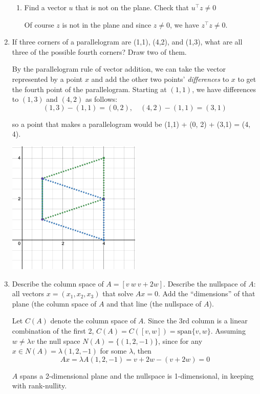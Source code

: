 \documentclass{scrartcl}
\begin{document}
\begin{enumerate}
\begin{enumerate}
\item Find a vector $u$ that is not on the plane. Check that $u^\top z \neq 0$


	Of course $z$ is not in the plane and since $z \neq 0$, we have $z^\top z \neq 0$.
\end{enumerate}

\item If three corners of a parallelogram are (1,1), (4,2), and (1,3), what are all three of the possible fourth corners? Draw two of them.

By the parallelogram rule of vector addition, we can take the vector represented by a point $x$ and add the other two points' \emph{differences} to $x$ to get the fourth point of the parallelogram. Starting at $(1,1)$, we have differences to $(1, 3)$ and $(4,2)$ as follows:
$$(1,3) - (1,1) = (0, 2), \quad (4,2) - (1,1) = (3,1)$$

so a point that makes a parallelogram would be (1,1) + (0, 2) + (3,1) = (4, 4).
\begin{center}
	\includegraphics[width=0.5\textwidth]{imgs/1.1.6.png}
\end{center}

\item Describe the column space of $A = [v \ w \ v+2w]$. Describe the nullspace of $A$: all vectors $x = (x_1, x_2, x_3)$ that solve $Ax = 0$. Add the ``dimensions'' of that plane (the column space of $A$ and that line (the nullspace of $A$).

Let $C(A)$ denote the column space of $A$. Since the 3rd column is a linear combination of the first 2, $C(A) = C([v, w]) = \text{span}\{v, w\}$. Assuming $w \neq \lambda v$ the null space $N(A) = \{(1, 2, -1)\}$, since for any $x \in N(A) = \lambda(1, 2, -1)$ for some $\lambda$, then 
$$Ax = \lambda A(1,2,-1) = v + 2w - (v + 2w) = 0$$

$A$ spans a 2-dimensional plane and the nullspace is 1-dimensional, in keeping with rank-nullity.


\end{enumerate}
\end{document}

